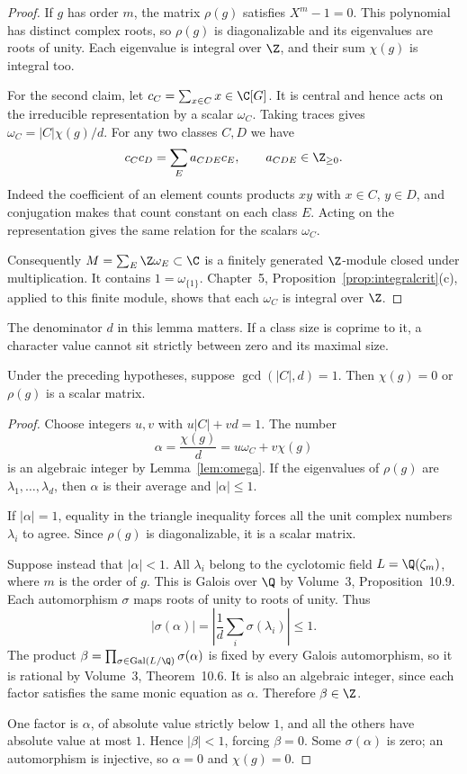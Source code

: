 \begin{proof}
If $g$ has order $m$, the matrix $\rho(g)$ satisfies $X^m-1=0$. This polynomial has distinct complex roots, so $\rho(g)$ is diagonalizable and its eigenvalues are roots of unity. Each eigenvalue is integral over $\Z$, and their sum $\chi(g)$ is integral too.

For the second claim, let $c_C=\sum_{x\in C}x\in\C[G]$. It is central and hence acts on the irreducible representation by a scalar $\omega_C$. Taking traces gives
$\omega_C=|C|\chi(g)/d$.
For any two classes $C,D$ we have
\[
c_Cc_D=\sum_Ea_{CDE}c_E,
\qquad a_{CDE}\in\Z_{\ge0}.
\]
Indeed the coefficient of an element counts products $xy$ with $x\in C$, $y\in D$, and conjugation makes that count constant on each class $E$. Acting on the representation gives the same relation for the scalars $\omega_C$.

Consequently $M=\sum_E\Z\omega_E\subset\C$ is a finitely generated $\Z$-module closed under multiplication. It contains $1=\omega_{\{1\}}$. Chapter~5, Proposition~\ref{prop:integralcrit}(c), applied to this finite module, shows that each $\omega_C$ is integral over $\Z$.
\end{proof}

The denominator $d$ in this lemma matters. If a class size is coprime to it, a character value cannot sit strictly between zero and its maximal size.

\begin{lemma}[Burnside]\label{lem:burnsidevanish}
Under the preceding hypotheses, suppose $\gcd(|C|,d)=1$. Then $\chi(g)=0$ or $\rho(g)$ is a scalar matrix.
\end{lemma}

\begin{proof}
Choose integers $u,v$ with $u|C|+vd=1$. The number
\[
\alpha=\frac{\chi(g)}d=u\omega_C+v\chi(g)
\]
is an algebraic integer by Lemma~\ref{lem:omega}. If the eigenvalues of $\rho(g)$ are $\lambda_1,\ldots,\lambda_d$, then $\alpha$ is their average and $|\alpha|\le1$.

If $|\alpha|=1$, equality in the triangle inequality forces all the unit complex numbers $\lambda_i$ to agree. Since $\rho(g)$ is diagonalizable, it is a scalar matrix.

Suppose instead that $|\alpha|<1$. All $\lambda_i$ belong to the cyclotomic field $L=\Q(\zeta_m)$, where $m$ is the order of $g$. This is Galois over $\Q$ by Volume~3, Proposition~10.9. Each automorphism $\sigma$ maps roots of unity to roots of unity. Thus
\[
|\sigma(\alpha)|
=\left|\frac1d\sum_i\sigma(\lambda_i)\right|\le1.
\]
The product $\beta=\prod_{\sigma\in\operatorname{Gal}(L/\Q)}\sigma(\alpha)$ is fixed by every Galois automorphism, so it is rational by Volume~3, Theorem~10.6. It is also an algebraic integer, since each factor satisfies the same monic equation as $\alpha$. Therefore $\beta\in\Z$.

One factor is $\alpha$, of absolute value strictly below $1$, and all the others have absolute value at most $1$. Hence $|\beta|<1$, forcing $\beta=0$. Some $\sigma(\alpha)$ is zero; an automorphism is injective, so $\alpha=0$ and $\chi(g)=0$.
\end{proof}

